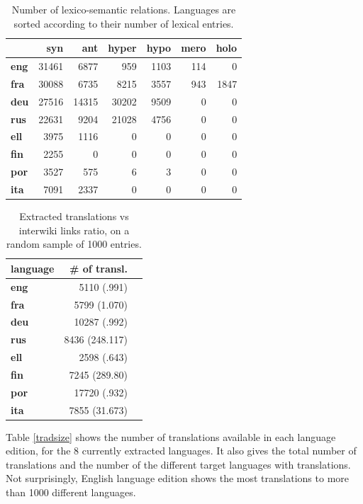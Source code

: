 \documentclass[sw]{iosart2c}
\begin{document}
\begin{table}[htb]
\begin{tabular}{lrrrrrr}
 & \textbf{syn}  & \textbf{ant} & \textbf{hyper} & \textbf{hypo} & \textbf{mero} & \textbf{holo} \\
 \hline
\textbf{eng} & 31461& 6877& 959& 1103& 114& 0 \\ 
\textbf{fra} & 30088& 6735& 8215& 3557& 943& 1847 \\ 
\textbf{deu} & 27516& 14315& 30202& 9509& 0& 0 \\ 
\textbf{rus} & 22631& 9204& 21028& 4756& 0& 0 \\ 
\textbf{ell} & 3975& 1116& 0& 0& 0& 0 \\ 
\textbf{fin} & 2255& 0& 0& 0& 0& 0 \\ 
\textbf{por} & 3527& 575& 6& 3& 0& 0 \\ 
\textbf{ita} & 7091& 2337& 0& 0& 0& 0 \\ 
\end{tabular}
\caption{Number of lexico-semantic relations. Languages are sorted according to their number of lexical entries.}\label{nymsize}
\end{table}

\begin{table}[htb]
\begin{tabular}{lrr}
\textbf{language} & \textbf{\# of transl.}\\
 \hline
\textbf{eng} & 5110 (.991) \\
\textbf{fra} & 5799 (1.070) \\
\textbf{deu} & 10287 (.992)\\
\textbf{rus} & 8436 (248.117) \\
\textbf{ell} & 2598 (.643) \\
\textbf{fin} & 7245 (289.80) \\
\textbf{por} & 17720 (.932) \\
\textbf{ita} & 7855 (31.673) 
\end{tabular}
\caption{Extracted translations vs interwiki links ratio, on a random sample of 1000 entries.}\label{iwlinks}
\end{table}

Table \ref{tradsize} shows the number of translations available in each language edition, for the 8 currently extracted languages. It also gives the total number of translations and the number of the different target languages with translations. Not surprisingly, English language edition shows the most translations to more than 1000 different languages. 
\end{document}
